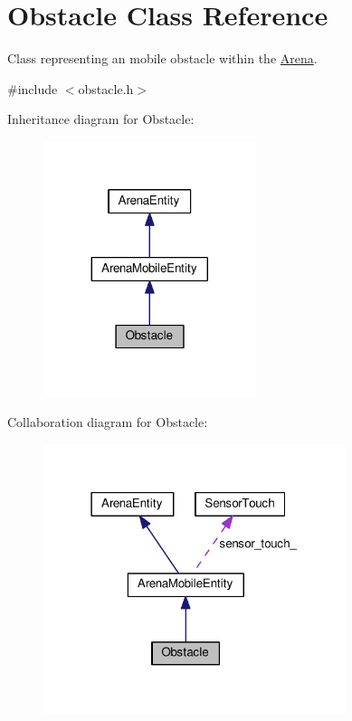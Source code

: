 \hypertarget{classObstacle}{}\section{Obstacle Class Reference}
\label{classObstacle}


Class representing an mobile obstacle within the \hyperlink{classArena}{Arena}.  




{\ttfamily \#include $<$obstacle.\+h$>$}



Inheritance diagram for Obstacle\+:\nopagebreak
\begin{figure}[H]
\begin{center}
\leavevmode
\includegraphics[width=176pt]{classObstacle__inherit__graph}
\end{center}
\end{figure}


Collaboration diagram for Obstacle\+:\nopagebreak
\begin{figure}[H]
\begin{center}
\leavevmode
\includegraphics[width=250pt]{classObstacle__coll__graph}
\end{center}
\end{figure}
